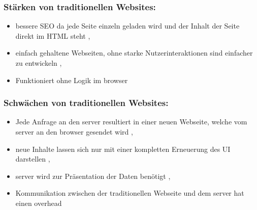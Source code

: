 \subsubsection*{Stärken von traditionellen Websites:}

\begin{itemize}
  \item bessere \ac{SEO} da jede Seite einzeln geladen wird und der Inhalt der Seite direkt im \ac{HTML} steht \cite{Smith2022}, \cite{Irudayaraj2019}
  \item einfach gehaltene Webseiten, ohne starke Nutzerinteraktionen sind einfacher zu entwickeln \cite{Smith2022}, \cite{Irudayaraj2019}
  \item Funktioniert ohne Logik im \gls{browser} \cite{Smith2022}
\end{itemize}

\subsubsection*{Schwächen von traditionellen Websites:}

\begin{itemize}
  \item Jede Anfrage an den \gls{server} resultiert in einer neuen Webseite, welche vom \gls{server} an den \gls{browser} gesendet wird \cite{Flanagan2011}, \cite{Robbins2018} \cite{Solovei2018}
  \item neue Inhalte lassen sich nur mit einer kompletten Erneuerung des \ac{UI} darstellen \cite{Flanagan2011}, \cite{Robbins2018}
  \item \gls{server} wird zur Präsentation der Daten benötigt \cite{Flanagan2011}, \cite{Robbins2018}
  \item Kommunikation zwischen der traditionellen Webseite und dem \gls{server} hat einen \gls{overhead} \cite{Flanagan2011}
\end{itemize}

